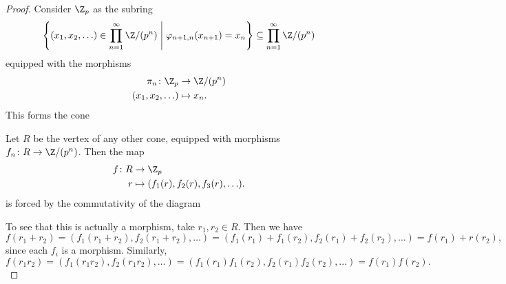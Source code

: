 \documentclass[10pt]{amsart}
\begin{document}
\begin{thm}
\begin{proof}
    Consider $\Z_p$ as the subring
    $$\left\{(x_1, x_2, \ldots) \in \prod_{n=1}^\infty \Z/(p^n) \;\middle\vert\; \varphi_{n+1,n}(x_{n+1}) = x_n \right\} \subseteq \prod_{n=1}^\infty \Z/(p^n)$$
    equipped with the morphisms 
    \begin{align*}
      \pi_n \colon \Z_p &\rightarrow \Z/(p^n)\\
      (x_1, x_2, \ldots) & \mapsto x_n.
    \end{align*}
    This forms the cone
    \begin{center}
    \end{center}
    Let $R$ be the vertex of any other cone, equipped with morphisms $f_n \colon R \rightarrow \Z/(p^n)$.
    Then the map 
    \begin{align*}
      f \colon R &\rightarrow \Z_p\\
      r &\mapsto (f_1(r), f_2(r), f_3(r), \ldots).
    \end{align*}
    is forced by the commutativity of the diagram
    \begin{center}
    \end{center}    
    To see that this is actually a morphism, take $r_1, r_2 \in R$.
    Then we have 
    $$f(r_1 + r_2) = (f_1(r_1 + r_2), f_2(r_1 + r_2), \ldots) = (f_1(r_1) + f_1(r_2), f_2(r_1) + f_2(r_2), \ldots) = f(r_1) + r(r_2),$$
    since each $f_i$ is a morphism.
    Similarly, 
    $$f(r_1 r_2) = (f_1(r_1 r_2), f_2(r_1 r_2), \ldots) = (f_1(r_1) f_1(r_2), f_2(r_1) f_2(r_2), \ldots) = f(r_1)f(r_2).$$
  \end{proof}
\end{thm}
\end{document}
